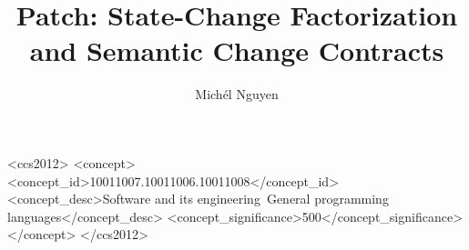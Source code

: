 \documentclass[english,submission]{programming}
\theoremstyle{plain}
\theoremstyle{remark}
\begin{document}
\title{Patch: State-Change Factorization and Semantic Change Contracts}
\author{Mich\'el Nguyen}

\begin{CCSXML}
<ccs2012>
<concept>
<concept_id>10011007.10011006.10011008</concept_id>
<concept_desc>Software and its engineering~General programming languages</concept_desc>
<concept_significance>500</concept_significance>
</concept>
</ccs2012>
\end{CCSXML}


\end{document}
